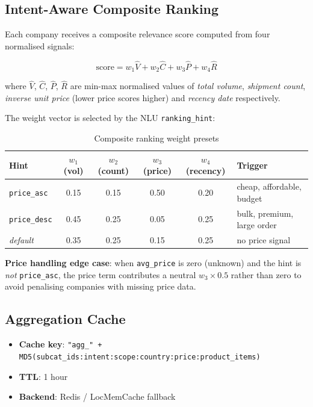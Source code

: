 \documentclass[12pt,a4paper]{article}
\begin{document}
\subsection{Intent-Aware Composite Ranking}

Each company receives a composite relevance score computed from four normalised signals:

\begin{equation}
  \text{score} = w_1 \hat{V} + w_2 \hat{C} + w_3 \hat{P} + w_4 \hat{R}
  \label{eq:score}
\end{equation}

where $\hat{V}$, $\hat{C}$, $\hat{P}$, $\hat{R}$ are min-max normalised values of
\emph{total volume}, \emph{shipment count}, \emph{inverse unit price} (lower price
scores higher) and \emph{recency date} respectively.

The weight vector is selected by the NLU \texttt{ranking\_hint}:

\begin{table}[H]
\centering
\renewcommand{\arraystretch}{1.3}
\begin{tabular}{lccccl}
\toprule
\rowcolor{tableheader!20}
\textbf{Hint} & $w_1$ (vol) & $w_2$ (count) & $w_3$ (price) & $w_4$ (recency) & \textbf{Trigger} \\
\midrule
\texttt{price\_asc}  & 0.15 & 0.15 & 0.50 & 0.20 & cheap, affordable, budget \\
\texttt{price\_desc} & 0.45 & 0.25 & 0.05 & 0.25 & bulk, premium, large order \\
\emph{default}       & 0.35 & 0.25 & 0.15 & 0.25 & no price signal \\
\bottomrule
\end{tabular}
\caption{Composite ranking weight presets}
\end{table}

\textbf{Price handling edge case}: when \texttt{avg\_price} is zero (unknown) and the
hint is \emph{not} \texttt{price\_asc}, the price term contributes a neutral
$w_3 \times 0.5$ rather than zero to avoid penalising companies with missing price data.

\subsection{Aggregation Cache}

\begin{itemize}
  \item \textbf{Cache key}: \texttt{"agg\_" + MD5(subcat\_ids:intent:scope:country:price:product\_items)}
  \item \textbf{TTL}: 1 hour
  \item \textbf{Backend}: Redis / LocMemCache fallback
\end{itemize}
\end{document}
